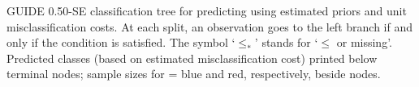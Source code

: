 \documentclass{article}
\begin{document}
GUIDE  0.50-SE classification tree for predicting \texttt{} using
 estimated priors
 and unit misclassification costs.
At each split, an observation goes to the left branch 
 if and only if the condition is satisfied.
 The symbol `$\leq_*$' stands for `$\leq$ or missing'.
Predicted classes (based on estimated misclassification cost) printed below terminal nodes;
 sample sizes for \texttt{} =
 blue and red, respectively, beside nodes.
 
\end{document}
